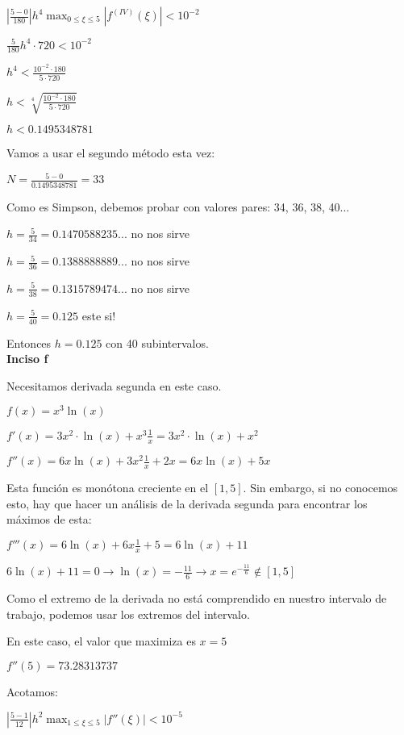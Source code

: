 \documentclass[11pt]{article}
\begin{document}
	$\displaystyle \left| \frac{5-0}{180} \right|h^4 \max_{0\le \xi \le 5}\left| f^{(IV)}(\xi) \right|<10^{-2}$
	
	$\displaystyle \frac{5}{180} h^4 \cdot 720 <10^{-2}$
	
	$\displaystyle h^4<\frac{10^{-2}\cdot180}{5\cdot 720}$
	
	$\displaystyle h<\sqrt[4]{\frac{10^{-2}\cdot180}{5\cdot 720}}$
	
	$h<0.1495348781$
	
	Vamos a usar el segundo método esta vez:
	
	$\displaystyle N=\frac{5-0}{0.1495348781}=33$
	
	Como es Simpson, debemos probar con valores pares: 34, 36, 38, 40...
	
	$\displaystyle h=\frac{5}{34}=0.1470588235...$ no nos sirve
	
	$\displaystyle h=\frac{5}{36}=0.1388888889...$ no nos sirve
	
	$\displaystyle h=\frac{5}{38}=0.1315789474...$ no nos sirve
	
	$\displaystyle h=\frac{5}{40}=0.125$ este si!
	
	Entonces $h=0.125$ con 40 subintervalos.\\
	
	\textbf{Inciso f}
	
	Necesitamos derivada segunda en este caso.
	
	$f(x)=x^3\ln(x)$
	
	$\displaystyle f'(x)=3x^2\cdot \ln(x)+x^3 \frac{1}{x}=3x^2 \cdot \ln(x)+x^2$
	
	$\displaystyle f''(x)=6x\ln(x)+3x^2 \frac{1}{x}+2x=6x \ln(x)+5x$
	
	Esta función es monótona creciente en el $[1,5]$. Sin embargo, si no conocemos esto, hay que hacer un análisis de la derivada segunda para encontrar los máximos de esta:
	
	$\displaystyle f'''(x)=6\ln(x)+6x\frac{1}{x}+5=6\ln(x)+11$
	
	$\displaystyle 6\ln(x)+11=0 \rightarrow \ln(x)=-\frac{11}{6} \rightarrow x= e^{-\frac{11}{6}} \notin [1,5]$
	
	Como el extremo de la derivada no está comprendido en nuestro intervalo de trabajo, podemos usar los extremos del intervalo.
	
	En este caso, el valor que maximiza es $x=5$
	
	$f''(5)=73.28313737$
	
	Acotamos:
	
	$\displaystyle \left| \frac{5-1}{12} \right|h^2 \max_{1\le \xi \le 5} \left|f''(\xi) \right|<10^{-5}$
	
\end{document}
